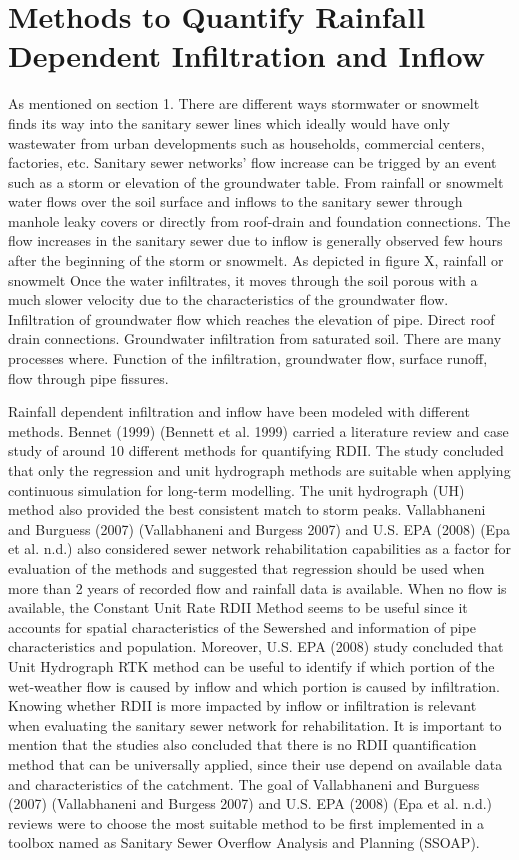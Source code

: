 \section{Methods to Quantify Rainfall Dependent Infiltration and Inflow}


As mentioned on section 1. There are different ways stormwater or snowmelt finds its way into the sanitary sewer lines which ideally would have only wastewater from urban developments such as households, commercial centers, factories, etc.  Sanitary sewer networks’ flow increase can be trigged by an event such as a storm or elevation of the groundwater table. From rainfall or snowmelt water flows over the soil surface and inflows to the sanitary sewer through manhole leaky covers or directly from roof-drain and foundation connections. The flow increases in the sanitary sewer due to inflow is generally observed few hours after the beginning of the storm or snowmelt. As depicted in figure X, rainfall or snowmelt   Once the water infiltrates, it moves through the soil porous with a much slower velocity due to the characteristics of the groundwater flow. Infiltration of groundwater flow which reaches the elevation of pipe. Direct roof drain connections. Groundwater infiltration from saturated soil.   
There are many processes where. Function of the infiltration, groundwater flow, surface runoff, flow through pipe fissures.

Rainfall dependent infiltration and inflow have been modeled with different methods. Bennet (1999) (Bennett et al. 1999) carried a literature review and case study of around 10 different methods for quantifying RDII. 
The study concluded that only the regression and unit hydrograph methods are suitable when applying continuous simulation for long-term modelling. The unit hydrograph (UH) method also provided the best consistent match to storm peaks. Vallabhaneni and Burguess (2007) (Vallabhaneni and Burgess 2007) and U.S. EPA (2008) (Epa et al. n.d.) also considered sewer network rehabilitation capabilities as a factor for evaluation of the methods and suggested that regression should be used when more than 2 years of recorded flow and rainfall data is available. When no flow is available, the Constant Unit Rate RDII Method seems to be useful since it accounts for spatial characteristics of the Sewershed and information of pipe characteristics and population. Moreover, U.S. EPA (2008) study concluded that Unit Hydrograph RTK method can be useful to identify if which portion of the wet-weather flow is caused by inflow and which portion is caused by infiltration. Knowing whether RDII is more impacted by inflow or infiltration is relevant when evaluating the sanitary sewer network for rehabilitation. 
It is important to mention that the studies also concluded that there is no RDII quantification method that can be universally applied, since their use depend on available data and characteristics of the catchment. The goal of Vallabhaneni and Burguess (2007) (Vallabhaneni and Burgess 2007) and U.S. EPA (2008) (Epa et al. n.d.) reviews were to choose the most suitable method to be first implemented in a toolbox named as Sanitary Sewer Overflow Analysis and Planning (SSOAP). 




